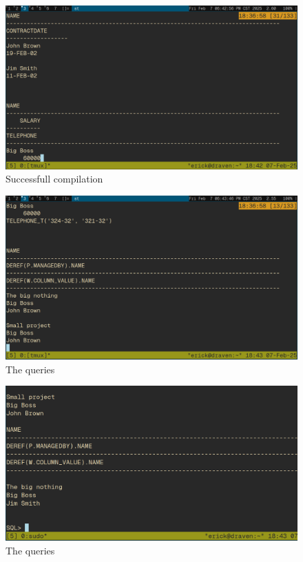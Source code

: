 \documentclass{article}
\begin{document}
\begin{figure}[H]
	\centering
	\includegraphics[width=1\textwidth]{imgs/p5.png}
	\caption{Successfull compilation}
	\label{fig:24}
\end{figure}


\begin{figure}[H]
	\centering
	\includegraphics[width=1\textwidth]{imgs/p6.png}
	\caption{The queries}
	\label{fig:25}
\end{figure}

\begin{figure}[H]
	\centering
	\includegraphics[width=1\textwidth]{imgs/p7.png}
	\caption{The queries}
	\label{fig:26}
\end{figure}
\end{document}
